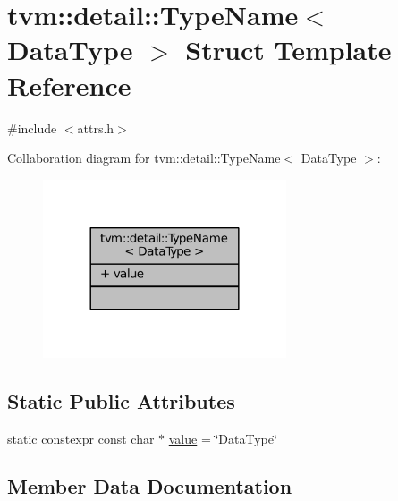 \hypertarget{structtvm_1_1detail_1_1TypeName_3_01DataType_01_4}{}\section{tvm\+:\+:detail\+:\+:Type\+Name$<$ Data\+Type $>$ Struct Template Reference}
\label{structtvm_1_1detail_1_1TypeName_3_01DataType_01_4}


{\ttfamily \#include $<$attrs.\+h$>$}



Collaboration diagram for tvm\+:\+:detail\+:\+:Type\+Name$<$ Data\+Type $>$\+:
\nopagebreak
\begin{figure}[H]
\begin{center}
\leavevmode
\includegraphics[width=204pt]{structtvm_1_1detail_1_1TypeName_3_01DataType_01_4__coll__graph}
\end{center}
\end{figure}
\subsection*{Static Public Attributes}
\begin{DoxyCompactItemize}
\item 
static constexpr const char $\ast$ \hyperlink{structtvm_1_1detail_1_1TypeName_3_01DataType_01_4_a53fef3c8f6efd6960f326efdc7247191}{value} = \char`\"{}Data\+Type\char`\"{}
\end{DoxyCompactItemize}


\subsection{Member Data Documentation}
